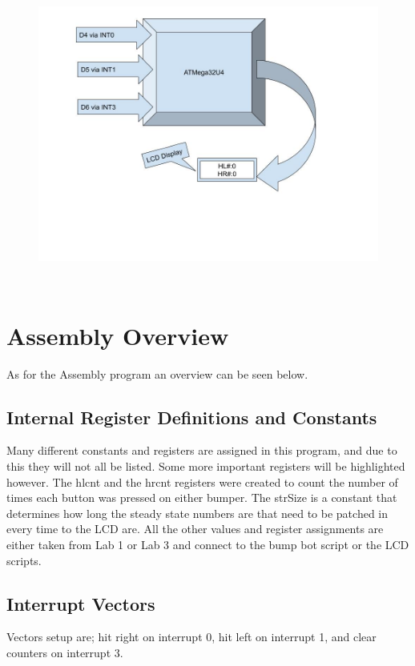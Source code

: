 \documentclass[12pt,letterpaper]{article}
\begin{document}
\begin{figure}[h]
	\includegraphics[width=12cm, height=10cm]{Block Diagram L5.jpg}
	\centering
\end{figure}
	
\section{Assembly Overview}
As for the Assembly program an overview can be seen below. 

\subsection{Internal Register Definitions and Constants}
Many different constants and registers are assigned in this program, and due to this they will not all be listed. Some more important registers will be highlighted however. The hlcnt and the hrcnt registers were created to count the number of times each button was pressed on either bumper. The strSize is a constant that determines how long the steady state numbers are that need to be patched in every time to the LCD are. All the other values and register assignments are either taken from Lab 1 or Lab 3 and connect to  the bump bot script or the LCD scripts.

\subsection{Interrupt Vectors}
Vectors setup are;
hit right on interrupt 0,
hit left on interrupt 1,
and clear counters on interrupt 3.
\end{document}
